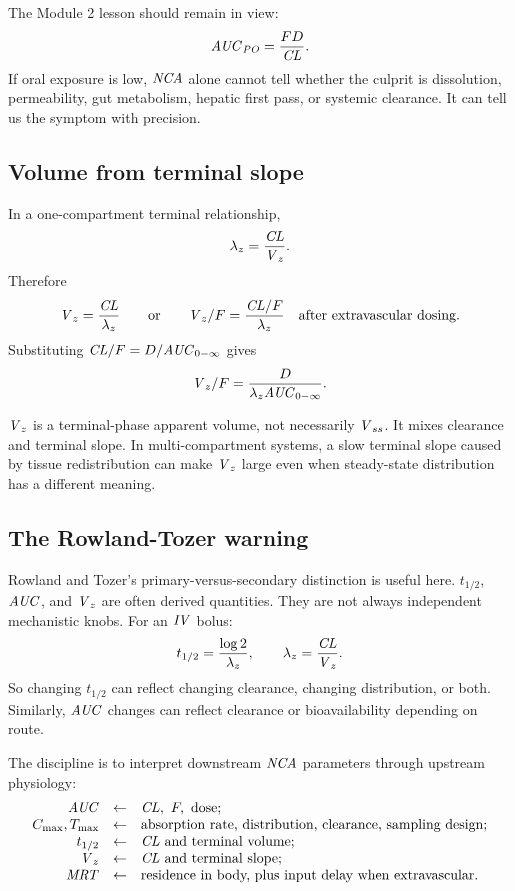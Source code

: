\documentclass[a4paper]{article}
\newcommand{\CL}{\ensuremath{\pksym{CL}}}
\newcommand{\CLF}{\ensuremath{\pksym{CL}/F}}
\newcommand{\Vz}{\ensuremath{\pksym{V}_z}}
\newcommand{\VzF}{\ensuremath{\pksym{V}_z/F}}
\newcommand{\Vss}{\ensuremath{\pksym{V}_{ss}}}
\newcommand{\AUC}{\ensuremath{\pksym{AUC}}}
\newcommand{\AUCinf}{\ensuremath{\pksym{AUC}_{0-\infty}}}
\newcommand{\MRT}{\ensuremath{\pksym{MRT}}}
\newcommand{\Cmax}{\ensuremath{C_{\pklab{max}}}}
\newcommand{\Tmax}{\ensuremath{T_{\pklab{max}}}}
\newcommand{\lambdaZ}{\ensuremath{\lambda_z}}
\newcommand{\halfLife}{\ensuremath{t_{1/2}}}
\newcommand{\Fbio}{\ensuremath{F}}
\newcommand{\NCA}{\ensuremath{\pksym{NCA}}}
\newcommand{\IV}{\ensuremath{\pksym{IV}}}
\newcommand{\PO}{\ensuremath{\pksym{PO}}}
\begin{document}
The Module 2 lesson should remain in view:
\[
  \AUC_{\PO}=\frac{\Fbio D}{\CL}.
\]
If oral exposure is low, \NCA{} alone cannot tell whether the culprit is dissolution, permeability, gut metabolism, hepatic first pass, or systemic clearance. It can tell us the symptom with precision.

\subsection{Volume from terminal slope}

In a one-compartment terminal relationship,
\[
  \lambdaZ=\frac{\CL}{\Vz}.
\]
Therefore
\[
  \Vz=\frac{\CL}{\lambdaZ}
  \qquad
  \text{or}\qquad
  \VzF=\frac{\CLF}{\lambdaZ}
  \quad\text{after extravascular dosing}.
\]
Substituting \(\CLF=D/\AUCinf\) gives
\[
  \VzF=\frac{D}{\lambdaZ\AUCinf}.
\]

\Vz{} is a terminal-phase apparent volume, not necessarily \Vss{}. It mixes clearance and terminal slope. In multi-compartment systems, a slow terminal slope caused by tissue redistribution can make \Vz{} large even when steady-state distribution has a different meaning.

\subsection{The Rowland-Tozer warning}

Rowland and Tozer's primary-versus-secondary distinction is useful here. \(\halfLife\), \AUC{}, and \(\Vz\) are often derived quantities. They are not always independent mechanistic knobs. For an \IV{} bolus:
\[
  \halfLife=\frac{\log 2}{\lambdaZ},
  \qquad
  \lambdaZ=\frac{\CL}{\Vz}.
\]
So changing \halfLife{} can reflect changing clearance, changing distribution, or both. Similarly, \AUC{} changes can reflect clearance or bioavailability depending on route.

The discipline is to interpret downstream \NCA{} parameters through upstream physiology:
\[
\begin{array}{rcl}
  \AUC &\leftarrow& \CL,\ F,\ \text{dose};\\
  \Cmax,\Tmax &\leftarrow& \text{absorption rate, distribution, clearance, sampling design};\\
  \halfLife &\leftarrow& \CL \text{ and terminal volume};\\
  \Vz &\leftarrow& \CL \text{ and terminal slope};\\
  \MRT &\leftarrow& \text{residence in body, plus input delay when extravascular.}
\end{array}
\]
\end{document}
